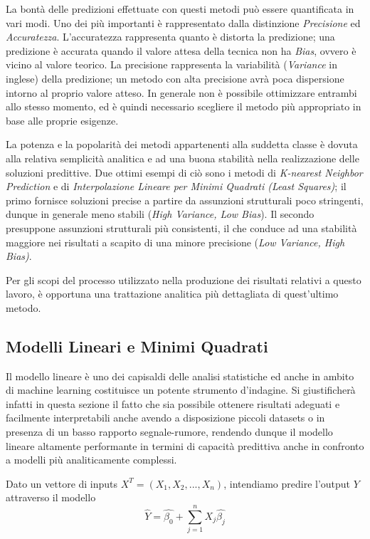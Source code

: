 \documentclass[12pt,openright,twoside,a4paper]{book}
\begin{document}
La bontà delle predizioni effettuate con questi metodi può essere quantificata in vari modi.
Uno dei più importanti è rappresentato dalla distinzione \textit{Precisione} ed \textit{Accuratezza}.
L'accuratezza rappresenta quanto è distorta la predizione; una predizione è accurata quando il valore attesa della tecnica non ha \textit{Bias}, ovvero è vicino al valore teorico.
La precisione rappresenta la variabilità (\textit{Variance} in inglese) della predizione; un metodo con alta precisione avrà poca dispersione intorno al proprio valore atteso.
In generale non è possibile ottimizzare entrambi allo stesso momento, ed è quindi necessario scegliere il metodo più appropriato in base alle proprie esigenze.

La potenza e la popolarità dei metodi appartenenti alla suddetta classe è dovuta alla relativa semplicità analitica e ad una buona stabilità nella realizzazione delle soluzioni predittive.
Due ottimi esempi di ciò sono i metodi di \textit{K-nearest Neighbor Prediction} e di \textit{Interpolazione Lineare per Minimi Quadrati (Least Squares)}; il primo fornisce soluzioni precise a partire da assunzioni strutturali poco stringenti, dunque in generale meno stabili (\textit{High Variance, Low Bias}).
Il secondo presuppone assunzioni strutturali più consistenti, il che conduce ad una stabilità maggiore nei risultati a scapito di una minore precisione (\textit{Low Variance, High Bias)}.

Per gli scopi del processo utilizzato nella produzione dei risultati relativi a questo lavoro, è opportuna una trattazione analitica più dettagliata di quest'ultimo metodo.

\subsection{Modelli Lineari e Minimi Quadrati}
Il modello lineare è uno dei capisaldi delle analisi statistiche ed anche in ambito di machine learning costituisce un potente strumento d'indagine.
Si giustificherà infatti in questa sezione il fatto che sia possibile ottenere risultati adeguati e facilmente interpretabili anche avendo a disposizione piccoli datasets o in presenza di un basso rapporto segnale-rumore, rendendo dunque il modello lineare altamente performante in termini di capacità predittiva anche in confronto a modelli più analiticamente complessi.

Dato un vettore di inputs  $X^T = (X_1,X_2,...,X_n)$, intendiamo predire l'output $Y$ attraverso il modello
\begin{equation}
\hat{Y}=\hat{\beta_0}+\sum_{j=1}^{n}X_j\hat{\beta_j}
\end{equation}
\end{document}
